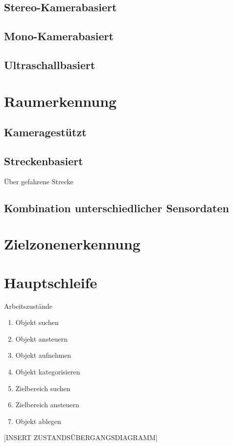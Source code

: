 \subsection{Stereo-Kamerabasiert}
\subsection{Mono-Kamerabasiert}
\subsection{Ultraschallbasiert}

\section{Raumerkennung}
\subsection{Kameragestützt}
\subsection{Streckenbasiert}
Über gefahrene Strecke
\subsection{Kombination unterschiedlicher Sensordaten}


\section{Zielzonenerkennung}


\section{Hauptschleife}

Arbeitszustände
\begin{enumerate}
\item{Objekt suchen}
\item{Objekt ansteuern}
\item{Objekt aufnehmen}
\item{Objekt kategorisieren}
\item{Zielbereich suchen}
\item{Zielbereich ansteuern}
\item{Objekt ablegen}
\end{enumerate}

[INSERT ZUSTANDSÜBERGANGSDIAGRAMM]

